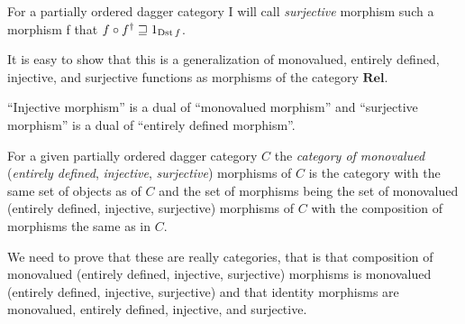 \begin{defn}
For a partially ordered dagger category
I will call \emph{surjective} morphism such a morphism f that $f\circ f^{\dagger}\sqsupseteq1_{\operatorname{Dst} f}$.\end{defn}
\begin{rem}
It is easy to show that this is a generalization of monovalued, entirely
defined, injective, and surjective functions as morphisms of the category
$\mathbf{Rel}$.\end{rem}
\begin{obvious}
``Injective morphism'' is a dual of ``monovalued morphism'' and
``surjective morphism'' is a dual of ``entirely defined morphism''.\end{obvious}
\begin{defn}
For a given partially ordered dagger category $C$ the \emph{category
of monovalued} (\emph{entirely defined}, \emph{injective}, \emph{surjective})
morphisms of $C$ is the category with the same set of objects as
of $C$ and the set of morphisms being the set of monovalued (entirely
defined, injective, surjective) morphisms of $C$ with the composition
of morphisms the same as in $C$.
\end{defn}
We need to prove that these are really categories, that is that composition
of monovalued (entirely defined, injective, surjective) morphisms
is monovalued (entirely defined, injective, surjective) and that identity
morphisms are monovalued, entirely defined, injective, and surjective.

